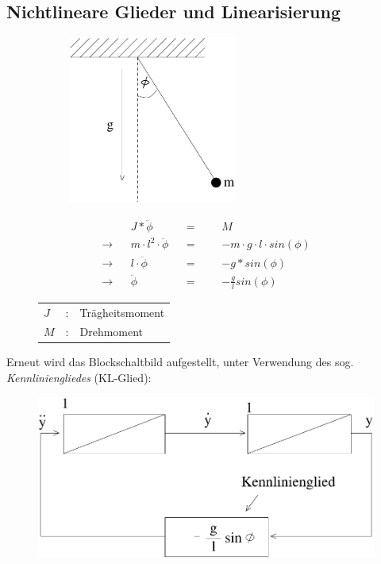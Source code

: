 \documentclass[12pt,a4paper,ngerman]{scrartcl}
\begin{document}
\subsection{Nichtlineare Glieder und Linearisierung}

\begin{figure}[H]
  \begin{minipage}{.4\linewidth} %
\begin{figure}[H]
\includegraphics[height=5.5cm]{sysregel_bsp_6} %
\end{figure}
 \end{minipage}%
  \begin{minipage}{.6\linewidth} %
   \begin{align*}
    &&J*\ddot{\phi}&&=&&&M\\
\rightarrow&& m\cdot l^2 \cdot \ddot{\phi} &&=&&& -m\cdot g \cdot l \cdot sin(\phi)\\
\rightarrow&& l \cdot \ddot{\phi}&&=&&&-g*sin(\phi)\\
\rightarrow&& \ddot{\phi}&&=&&& -\frac{g}{l}sin(\phi)
   \end{align*}
   \begin{tabular}{lll}
$J$&:& Trägheitsmoment\\
$M$&:& Drehmoment
  
   \end{tabular}

\end{minipage}%
\end{figure}

Erneut wird das Blockschaltbild aufgestellt, unter Verwendung des sog. \emph{Kennliniengliedes} (KL-Glied):

\begin{figure}[H]
  \centering
  \includegraphics[width=.5\linewidth]{sysregel_bsb4}
\end{figure}
\end{document}
